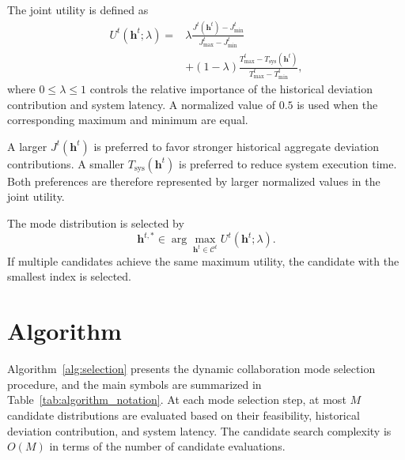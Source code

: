 \documentclass[5p,times]{elsarticle}
\theoremstyle{plain}
\theoremstyle{definition}
\theoremstyle{remark}
\begin{document}
The joint utility is defined as
\begin{equation}
\begin{aligned}
U^t(\mathbf h^t;\lambda)
={}&\lambda
\frac{J^t(\mathbf h^t)-J_{\min}^t}
{J_{\max}^t-J_{\min}^t}\\
&+(1-\lambda)
\frac{T_{\max}^t-T_{\mathrm{sys}}(\mathbf h^t)}
{T_{\max}^t-T_{\min}^t},
\end{aligned}
\label{eq:joint_utility}
\end{equation}
where $0\leq\lambda\leq1$ controls the relative
importance of the historical deviation
contribution and system latency.
A normalized value of $0.5$ is used when
the corresponding maximum and minimum are equal.

A larger $J^t(\mathbf h^t)$ is preferred
to favor stronger historical aggregate
deviation contributions.
A smaller $T_{\mathrm{sys}}(\mathbf h^t)$
is preferred to reduce system execution time.
Both preferences are therefore represented
by larger normalized values in the joint utility.

The mode distribution is selected by
\begin{equation}
\mathbf h^{t,\ast}
\in
\arg\max_{\mathbf h^t\in\mathcal C^t}
U^t(\mathbf h^t;\lambda).
\label{eq:joint_selection}
\end{equation}
If multiple candidates achieve the same
maximum utility, the candidate with the
smallest index is selected.

\section{Algorithm}
\label{sec:algorithm}

Algorithm~\ref{alg:selection} presents the
dynamic collaboration mode selection procedure,
and the main symbols are summarized in
Table~\ref{tab:algorithm_notation}.
At each mode selection step, at most $M$
candidate distributions are evaluated
based on their feasibility, historical
deviation contribution, and system latency.
The candidate search complexity is $O(M)$
in terms of the number of candidate evaluations.
\end{document}
